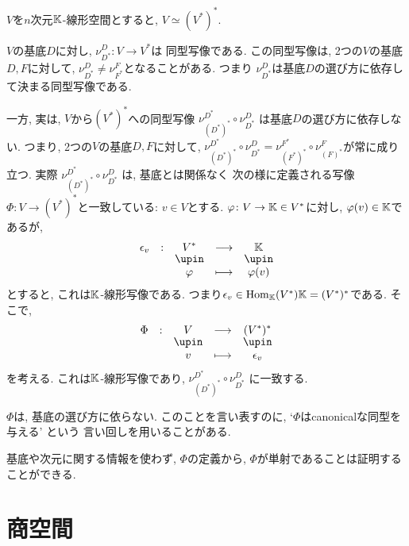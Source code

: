 \begin{cor}
$V$を$n$次元$\mathbb{K}$-線形空間とすると,
$V\simeq (V^\ast)^\ast$.
\end{cor}

\begin{remark}
$V$の基底$D$に対し,
$\nu^{D}_{D^\ast}\colon V\to V^\ast$は
同型写像である.
この同型写像は,
2つの$V$の基底$D,F$に対して,
$\nu^{D}_{D^\ast}\neq \nu^{F}_{F^\ast}$となることがある.
つまり
$\nu^{D}_{D^\ast}$は基底$D$の選び方に依存して決まる同型写像である.

一方, 実は,
$V$から$(V^\ast)^\ast$への同型写像
$\nu^{D^\ast}_{(D^\ast)^\ast}\circ\nu^{D}_{D^\ast}$
は基底$D$の選び方に依存しない.
つまり,
2つの$V$の基底$D,F$に対して,
$\nu^{D^\ast}_{(D^\ast)^\ast}\circ\nu^{D}_{D^\ast}=\nu^{F^\ast}_{(F^\ast)^\ast}\circ\nu^{F}_{(F)^\ast}$が常に成り立つ.
実際
$\nu^{D^\ast}_{(D^\ast)^\ast}\circ\nu^{D}_{D^\ast}$
は,
基底とは関係なく
次の様に定義される写像$\Phi\colon V\to (V^\ast)^\ast$と一致している:
$v\in V$とする.
$\varphi\colon V\to\mathbb{K}\in V^\ast$に対し,
$\varphi(v)\in \mathbb{K}$であるが,
\begin{align*}
\shazo{\epsilon_v}{V^\ast}{\KK}
{\varphi}{\varphi(v)}
\end{align*}
とすると, これは$\mathbb{K}$-線形写像である.
つまり$\epsilon_v\in \operatorname{Hom}_{\mathbb{K}}(V^\ast){\mathbb{K}}=(V^\ast)^\ast$である.
そこで,
\begin{align*}
\shazo{\Phi}{V}{(V^\ast)^\ast}
{v}{\epsilon_v}
\end{align*}
を考える.
これは$\mathbb{K}$-線形写像であり,
$\nu^{D^\ast}_{(D^\ast)^\ast}\circ\nu^{D}_{D^\ast}$
に一致する.
\end{remark}
\begin{remark}
$\Phi$は,
基底の選び方に依らない.
このことを言い表すのに,
`$\Phi$はcanonicalな同型を与える'
という
言い回しを用いることがある.

基底や次元に関する情報を使わず,
$\Phi$の定義から,
$\Phi$が単射であることは証明することができる.
\end{remark}



\begin{quiz}
\end{quiz}

\chapter{商空間}
\label{chap:quotient}
